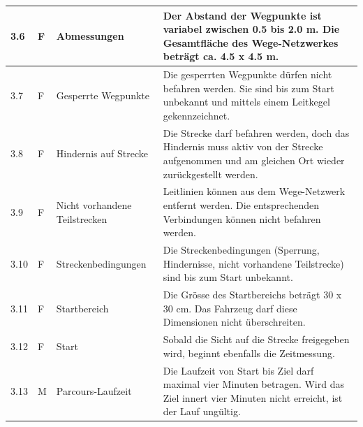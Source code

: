 \documentclass[../main.tex]{subfiles}
\begin{document}
\begin{tabular}{|l|p{0.5cm}|p{4cm}|p{10cm}|}
  \hline
  3.6          & F          & Abmessungen                   & Der Abstand der Wegpunkte ist variabel zwischen 0.5 bis 2.0 m. Die Gesamtfläche des Wege-Netzwerkes beträgt ca. 4.5 x 4.5 m.                                                                                         \\
  \hline
  3.7          & F          & Gesperrte Wegpunkte           & Die gesperrten Wegpunkte dürfen nicht befahren werden. Sie sind bis zum Start unbekannt und mittels einem Leitkegel gekennzeichnet.                                                                                  \\
  \hline
  3.8          & F          & Hindernis auf Strecke         & Die Strecke darf befahren werden, doch das Hindernis muss aktiv von der Strecke aufgenommen und am gleichen Ort wieder zurückgestellt werden.                                                                        \\
  \hline
  3.9          & F          & Nicht vorhandene Teilstrecken & Leitlinien können aus dem Wege-Netzwerk entfernt werden. Die entsprechenden Verbindungen können nicht befahren werden.                                                                                               \\
  \hline
  3.10         & F          & Streckenbedingungen           & Die Streckenbedingungen (Sperrung, Hindernisse, nicht vorhandene Teilstrecke) sind bis zum Start unbekannt.                                                                                                          \\
  \hline
  3.11         & F          & Startbereich                  & Die Grösse des Startbereichs beträgt 30 x 30 cm. Das Fahrzeug darf diese Dimensionen nicht überschreiten.                                                                                                            \\
  \hline
  3.12         & F          & Start                         & Sobald die Sicht auf die Strecke freigegeben wird, beginnt ebenfalls die Zeitmessung.                                                                                                                                \\
  \hline
  3.13         & M          & Parcours-Laufzeit             & Die Laufzeit von Start bis Ziel darf maximal vier Minuten betragen. Wird das Ziel innert vier Minuten nicht erreicht, ist der Lauf ungültig.                                                                         \\
  \hline
\end{tabular}
\end{document}

